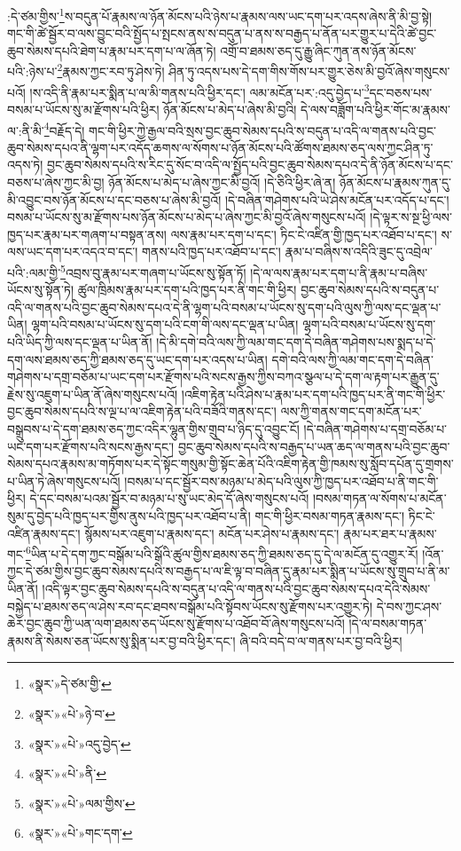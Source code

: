 :དེ་ཙམ་གྱིས་\footnote{«སྣར་»དེ་ཙམ་གྱི་}ས་བདུན་པོ་རྣམས་ལ་ཉོན་མོངས་པའི་ཉེས་པ་རྣམས་ལས་ཡང་དག་པར་འདས་ཞེས་ནི་མི་བྱ་སྟེ། གང་གི་ཚེ་སྦྱོར་བ་ལས་བྱུང་བའི་སྤྱོད་པ་སྤངས་ནས་ས་བདུན་པ་ནས་ས་བརྒྱད་པ་ནོན་པར་གྱུར་པ་དེའི་ཚེ་བྱང་ཆུབ་སེམས་དཔའི་ཐེག་པ་རྣམ་པར་དག་པ་ལ་ཞོན་ཏེ། འགྲོ་བ་ཐམས་ཅད་དུ་རྒྱུ་ཞིང་ཀུན་ནས་ཉོན་མོངས་པའི་:ཉེས་པ་\footnote{«སྣར་»«པེ་»ཉེ་བ་}རྣམས་ཀྱང་རབ་ཏུ་ཤེས་ཏེ། ཤིན་ཏུ་འདས་པས་དེ་དག་གིས་གོས་པར་གྱུར་ཅེས་མི་བྱའོ་ཞེས་གསུངས་པའོ། །ས་འདི་ནི་རྣམ་པར་སྨིན་པ་ལ་མི་གནས་པའི་ཕྱིར་དང་། ལམ་མངོན་པར་:འདུ་བྱེད་པ་\footnote{«སྣར་»«པེ་»འདུ་བྱེད་}དང་བཅས་པས་བསམ་པ་ཡོངས་སུ་མ་རྫོགས་པའི་ཕྱིར། ཉོན་མོངས་པ་མེད་པ་ཞེས་མི་བྱའི། དེ་ལས་བཟློག་པའི་ཕྱིར་གོང་མ་རྣམས་ལ་:ནི་མི་\footnote{«སྣར་»«པེ་»ནི་}བརྗོད་དེ། གང་གི་ཕྱིར་ཀྱེ་རྒྱལ་བའི་སྲས་བྱང་ཆུབ་སེམས་དཔའི་ས་བདུན་པ་འདི་ལ་གནས་པའི་བྱང་ཆུབ་སེམས་དཔའ་ནི་ལྷག་པར་འདོད་ཆགས་ལ་སོགས་པ་ཉོན་མོངས་པའི་ཚོགས་ཐམས་ཅད་ལས་ཀྱང་ཤིན་ཏུ་འདས་ཏེ། བྱང་ཆུབ་སེམས་དཔའི་ས་རིང་དུ་སོང་བ་འདི་ལ་སྤྱོད་པའི་བྱང་ཆུབ་སེམས་དཔའ་དེ་ནི་ཉོན་མོངས་པ་དང་བཅས་པ་ཞེས་ཀྱང་མི་བྱ། ཉོན་མོངས་པ་མེད་པ་ཞེས་ཀྱང་མི་བྱའོ། །དེ་ཅིའི་ཕྱིར་ཞེ་ན། ཉོན་མོངས་པ་རྣམས་ཀུན་དུ་མི་འབྱུང་བས་ཉོན་མོངས་པ་དང་བཅས་པ་ཞེས་མི་བྱའོ། །དེ་བཞིན་གཤེགས་པའི་ཡེ་ཤེས་མངོན་པར་འདོད་པ་དང་། བསམ་པ་ཡོངས་སུ་མ་རྫོགས་པས་ཉོན་མོངས་པ་མེད་པ་ཞེས་ཀྱང་མི་བྱའོ་ཞེས་གསུངས་པའོ། །དེ་ལྟར་ས་སྔ་ཕྱི་ལས་ཁྱད་པར་རྣམ་པར་གཞག་པ་བསྟན་ནས། ལས་རྣམ་པར་དག་པ་དང་། ཏིང་ངེ་འཛིན་གྱི་ཁྱད་པར་འཐོབ་པ་དང་། ས་ལས་ཡང་དག་པར་འདའ་བ་དང་། གནས་པའི་ཁྱད་པར་འཐོབ་པ་དང་། རྣམ་པ་བཞིས་ས་འདིའི་ཟུང་དུ་འབྲེལ་པའི་:ལམ་གྱི་\footnote{«སྣར་»«པེ་»ལམ་གྱིས་}འབྲས་བུ་རྣམ་པར་གཞག་པ་ཡོངས་སུ་སྟོན་ཏོ། །དེ་ལ་ལས་རྣམ་པར་དག་པ་ནི་རྣམ་པ་བཞིས་ཡོངས་སུ་སྟོན་ཏེ། ཚུལ་ཁྲིམས་རྣམ་པར་དག་པའི་ཁྱད་པར་ནི་གང་གི་ཕྱིར། བྱང་ཆུབ་སེམས་དཔའི་ས་བདུན་པ་འདི་ལ་གནས་པའི་བྱང་ཆུབ་སེམས་དཔའ་དེ་ནི་ལྷག་པའི་བསམ་པ་ཡོངས་སུ་དག་པའི་ལུས་ཀྱི་ལས་དང་ལྡན་པ་ཡིན། ལྷག་པའི་བསམ་པ་ཡོངས་སུ་དག་པའི་ངག་གི་ལས་དང་ལྡན་པ་ཡིན། ལྷག་པའི་བསམ་པ་ཡོངས་སུ་དག་པའི་ཡིད་ཀྱི་ལས་དང་ལྡན་པ་ཡིན་ནོ། །དེ་མི་དགེ་བའི་ལས་ཀྱི་ལམ་གང་དག་དེ་བཞིན་གཤེགས་པས་སྨད་པ་དེ་དག་ལས་ཐམས་ཅད་ཀྱི་ཐམས་ཅད་དུ་ཡང་དག་པར་འདས་པ་ཡིན། དགེ་བའི་ལས་ཀྱི་ལམ་གང་དག་དེ་བཞིན་གཤེགས་པ་དགྲ་བཅོམ་པ་ཡང་དག་པར་རྫོགས་པའི་སངས་རྒྱས་ཀྱིས་བཀའ་སྩལ་པ་དེ་དག་ལ་རྟག་པར་རྒྱུན་དུ་རྗེས་སུ་འཇུག་པ་ཡིན་ནོ་ཞེས་གསུངས་པའོ། །འཇིག་རྟེན་པའི་ཤེས་པ་རྣམ་པར་དག་པའི་ཁྱད་པར་ནི་གང་གི་ཕྱིར་བྱང་ཆུབ་སེམས་དཔའི་ས་ལྔ་པ་ལ་འཇིག་རྟེན་པའི་བཟོའི་གནས་དང་། ལས་ཀྱི་གནས་གང་དག་མངོན་པར་བསྒྲུབས་པ་དེ་དག་ཐམས་ཅད་ཀྱང་འདིར་ལྷུན་གྱིས་གྲུབ་པ་ཉིད་དུ་འབྱུང་ངོ། །དེ་བཞིན་གཤེགས་པ་དགྲ་བཅོམ་པ་ཡང་དག་པར་རྫོགས་པའི་སངས་རྒྱས་དང་། བྱང་ཆུབ་སེམས་དཔའི་ས་བརྒྱད་པ་ཡན་ཆད་ལ་གནས་པའི་བྱང་ཆུབ་སེམས་དཔའ་རྣམས་མ་གཏོགས་པར་དེ་སྟོང་གསུམ་གྱི་སྟོང་ཆེན་པོའི་འཇིག་རྟེན་གྱི་ཁམས་སུ་སློབ་དཔོན་དུ་གྲགས་པ་ཡིན་ཏེ་ཞེས་གསུངས་པའོ། །བསམ་པ་དང་སྦྱོར་བས་མཉམ་པ་མེད་པའི་ལུས་ཀྱི་ཁྱད་པར་འཐོབ་པ་ནི་གང་གི་ཕྱིར། དེ་དང་བསམ་པའམ་སྦྱོར་བ་མཉམ་པ་སུ་ཡང་མེད་དོ་ཞེས་གསུངས་པའོ། །བསམ་གཏན་ལ་སོགས་པ་མངོན་སུམ་དུ་བྱེད་པའི་ཁྱད་པར་གྱིས་ནུས་པའི་ཁྱད་པར་འཐོབ་པ་ནི། གང་གི་ཕྱིར་བསམ་གཏན་རྣམས་དང་། ཏིང་ངེ་འཛིན་རྣམས་དང་། སྙོམས་པར་འཇུག་པ་རྣམས་དང་། མངོན་པར་ཤེས་པ་རྣམས་དང་། རྣམ་པར་ཐར་པ་རྣམས་གང་\footnote{«སྣར་»«པེ་»གང་དག་}ཡིན་པ་དེ་དག་ཀྱང་བསྒོམ་པའི་སྒོའི་ཚུལ་གྱིས་ཐམས་ཅད་ཀྱི་ཐམས་ཅད་དུ་དེ་ལ་མངོན་དུ་འགྱུར་རོ། །འོན་ཀྱང་དེ་ཙམ་གྱིས་བྱང་ཆུབ་སེམས་དཔའི་ས་བརྒྱད་པ་ལ་ཇི་ལྟ་བ་བཞིན་དུ་རྣམ་པར་སྨིན་པ་ཡོངས་སུ་གྲུབ་པ་ནི་མ་ཡིན་ནོ། །འདི་ལྟར་བྱང་ཆུབ་སེམས་དཔའི་ས་བདུན་པ་འདི་ལ་གནས་པའི་བྱང་ཆུབ་སེམས་དཔའ་དེའི་སེམས་བསྐྱེད་པ་ཐམས་ཅད་ལ་ཤེས་རབ་དང་ཐབས་བསྒོམ་པའི་སྟོབས་ཡོངས་སུ་རྫོགས་པར་འགྱུར་ཏེ། དེ་བས་ཀྱང་ཤས་ཆེར་བྱང་ཆུབ་ཀྱི་ཡན་ལག་ཐམས་ཅད་ཡོངས་སུ་རྫོགས་པ་འཐོབ་བོ་ཞེས་གསུངས་པའོ། །དེ་ལ་བསམ་གཏན་རྣམས་ནི་སེམས་ཅན་ཡོངས་སུ་སྨིན་པར་བྱ་བའི་ཕྱིར་དང་། ཞི་བའི་བདེ་བ་ལ་གནས་པར་བྱ་བའི་ཕྱིར། 
